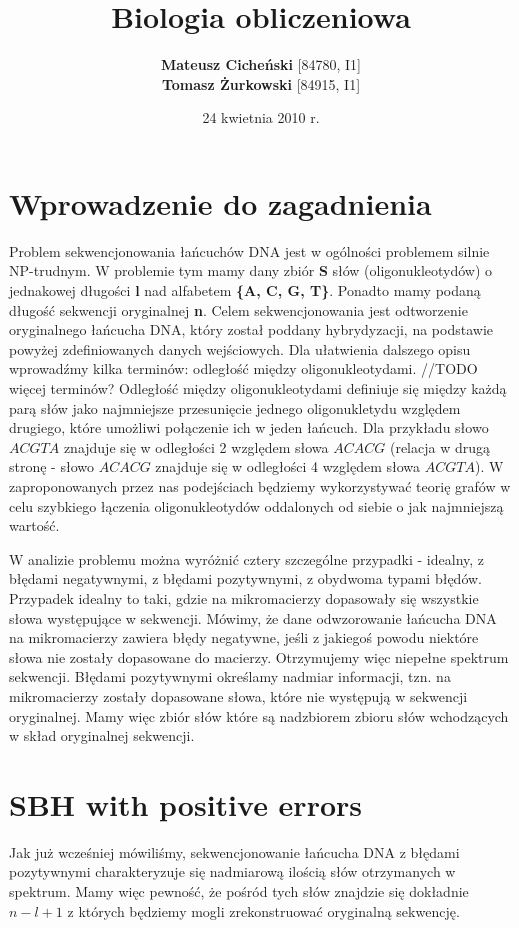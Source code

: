 \documentclass[a4paper,10pt]{article}
\title{\textbf{Biologia obliczeniowa}}
\author{\textbf{Mateusz Cicheński} [84780, I1]\\ \textbf{Tomasz Żurkowski} [84915, I1]}
\date{24 kwietnia 2010 r.}
\begin{document}
 
\maketitle

\tableofcontents

\newpage

\section{Wprowadzenie do zagadnienia}

Problem sekwencjonowania łańcuchów DNA jest w ogólności problemem silnie NP-trudnym. W problemie tym mamy dany zbiór {\bf S} słów (oligonukleotydów) o jednakowej długości {\bf l} nad alfabetem {\bf \{A, C, G, T\}}. Ponadto mamy podaną długość sekwencji oryginalnej {\bf n}. Celem sekwencjonowania jest odtworzenie oryginalnego łańcucha DNA, który został poddany hybrydyzacji, na podstawie powyżej zdefiniowanych danych wejściowych.
Dla ułatwienia dalszego opisu wprowadźmy kilka terminów: odległość między oligonukleotydami.
//TODO więcej terminów?
Odległość między oligonukleotydami definiuje się między każdą parą słów jako najmniejsze przesunięcie jednego oligonukletydu względem drugiego, które umożliwi połączenie ich w jeden łańcuch. Dla przykładu słowo $ACGTA$ znajduje się w odległości 2 względem słowa $ACACG$ (relacja w drugą stronę - słowo $ACACG$ znajduje się w odległości 4 względem słowa $ACGTA$).
W zaproponowanych przez nas podejściach będziemy wykorzystywać teorię grafów w celu szybkiego łączenia oligonukleotydów oddalonych od siebie o jak najmniejszą wartość.

W analizie problemu można wyróżnić cztery szczególne przypadki - idealny, z błędami negatywnymi, z błędami pozytywnymi, z obydwoma typami błędów.
Przypadek idealny to taki, gdzie na mikromacierzy dopasowały się wszystkie słowa występujące w sekwencji.
Mówimy, że dane odwzorowanie łańcucha DNA na mikromacierzy zawiera błędy negatywne, jeśli z jakiegoś powodu niektóre słowa nie zostały dopasowane do macierzy. Otrzymujemy więc niepełne spektrum sekwencji.
Błędami pozytywnymi określamy nadmiar informacji, tzn. na mikromacierzy zostały dopasowane słowa, które nie występują w sekwencji oryginalnej. Mamy więc zbiór słów które są nadzbiorem zbioru słów wchodzących w skład oryginalnej sekwencji.

\section{SBH with positive errors}
Jak już wcześniej mówiliśmy, sekwencjonowanie łańcucha DNA z błędami pozytywnymi charakteryzuje się nadmiarową ilością słów otrzymanych w spektrum. Mamy więc pewność, że pośród tych słów znajdzie się dokładnie $n-l+1$ z których będziemy mogli zrekonstruować oryginalną sekwencję.
\end{document}
